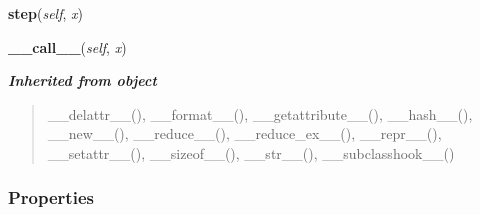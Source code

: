     \label{peach:optm:base:Optimizer:step}

    \vspace{0.5ex}

\hspace{.8\funcindent}\begin{boxedminipage}{\funcwidth}

    \raggedright \textbf{step}(\textit{self}, \textit{x})

\setlength{\parskip}{2ex}
\setlength{\parskip}{1ex}
    \end{boxedminipage}

    \label{peach:optm:base:Optimizer:__call__}

    \vspace{0.5ex}

\hspace{.8\funcindent}\begin{boxedminipage}{\funcwidth}

    \raggedright \textbf{\_\_call\_\_}(\textit{self}, \textit{x})

\setlength{\parskip}{2ex}
\setlength{\parskip}{1ex}
    \end{boxedminipage}


\large{\textbf{\textit{Inherited from object}}}

\begin{quote}
\_\_delattr\_\_(), \_\_format\_\_(), \_\_getattribute\_\_(), \_\_hash\_\_(), \_\_new\_\_(), \_\_reduce\_\_(), \_\_reduce\_ex\_\_(), \_\_repr\_\_(), \_\_setattr\_\_(), \_\_sizeof\_\_(), \_\_str\_\_(), \_\_subclasshook\_\_()
\end{quote}


  \subsubsection{Properties}

